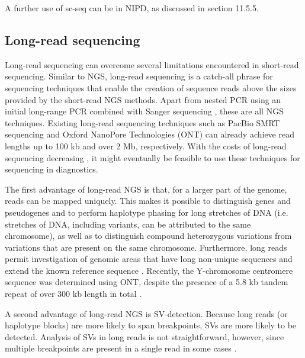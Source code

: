 A further use of sc-seq can be in NIPD, as discussed in section 11.5.5.

\subsection{Long-read sequencing}
Long-read sequencing can overcome several limitations encountered in short-read sequencing.
Similar to NGS, long-read sequencing is a catch-all phrase for sequencing techniques that enable the creation of sequence reads above the sizes provided by the short-read NGS methods. 
Apart from nested PCR using an initial long-range PCR combined with Sanger sequencing \cite{Michalatos_Beloin_1996,Tan_2012}, these are all NGS techniques. 
Existing long-read sequencing techniques such as PacBio SMRT sequencing \cite{Chaisson_2014} and Oxford NanoPore Technologies (ONT) \cite{Jain_2018a,Nanopore_2018} can already achieve read lengths up to 100 kb and over 2 Mb, respectively. 
With the costs of long-read sequencing decreasing \cite{van_Dijk_2018}, it might eventually be feasible to use these techniques for sequencing in diagnostics.

The first advantage of long-read NGS is that, for a larger part of the genome, reads can be mapped uniquely. 
This makes it possible to distinguish genes and pseudogenes and to perform haplotype phasing for long stretches of DNA (i.e. stretches of DNA, including variants, can be attributed to the same chromosome), as well as to distinguish compound heterozygous variations from variations that are present on the same chromosome. 
Furthermore, long reads permit investigation of genomic areas that have long non-unique sequences and extend the known reference sequence \cite{Ameur_2018}. 
Recently, the Y-chromosome centromere sequence was determined using ONT, despite the presence of a 5.8 kb tandem repeat of over 300 kb length in total \cite{Jain_2018b}.

A second advantage of long-read NGS is SV-detection. Because long reads (or haplotype blocks) are more likely to span breakpoints, SVs are more likely to be detected. Analysis of SVs in long reads is not straightforward, however, since multiple breakpoints are present in a single read in some cases \cite{Gong_2018,Pollard_2018}.

